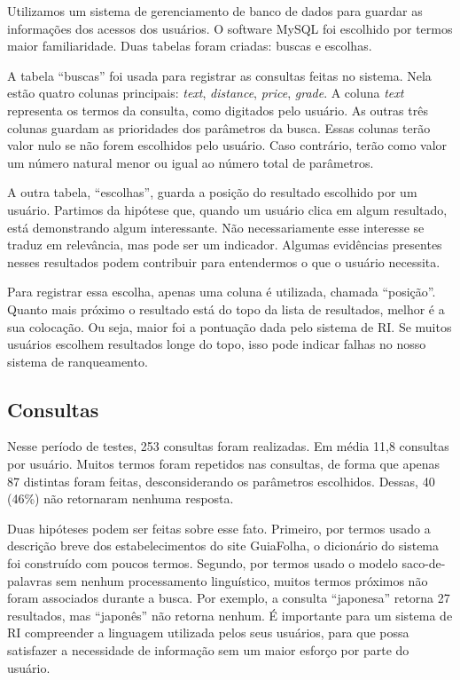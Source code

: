 Utilizamos um sistema de gerenciamento de banco de dados para guardar as informações dos acessos dos usuários. O software MySQL foi escolhido por termos maior familiaridade. Duas tabelas foram criadas: buscas e escolhas.

A tabela ``buscas'' foi usada para registrar as consultas feitas no sistema. Nela estão quatro colunas principais: \emph{text}, \emph{distance}, \emph{price}, \emph{grade}. A coluna \emph{text} representa os termos da consulta, como digitados pelo usuário. As outras três colunas guardam as prioridades dos parâmetros da busca. Essas colunas terão valor nulo se não forem escolhidos pelo usuário. Caso contrário, terão como valor um número natural menor ou igual ao número total de parâmetros.

A outra tabela, ``escolhas'', guarda a posição do resultado escolhido por um usuário. Partimos da hipótese que, quando um usuário clica em algum resultado, está demonstrando algum interessante. Não necessariamente esse interesse se traduz em relevância, mas pode ser um indicador. Algumas evidências presentes nesses resultados podem contribuir para entendermos o que o usuário necessita.

Para registrar essa escolha, apenas uma coluna é utilizada, chamada ``posição''. Quanto mais próximo o resultado está do topo da lista de resultados, melhor é a sua colocação. Ou seja, maior foi a pontuação dada pelo sistema de RI. Se muitos usuários escolhem resultados longe do topo, isso pode indicar falhas no nosso sistema de ranqueamento.

\subsection{Consultas}
\label{subsec:consultas}

Nesse período de testes, 253 consultas foram realizadas. Em média 11,8 consultas por usuário. Muitos termos foram repetidos nas consultas, de forma que apenas 87 distintas foram feitas, desconsiderando os parâmetros escolhidos. Dessas, 40 (46\%) não retornaram nenhuma resposta.

Duas hipóteses podem ser feitas sobre esse fato. Primeiro, por termos usado a descrição breve dos estabelecimentos do site GuiaFolha, o dicionário do sistema foi construído com poucos termos. Segundo, por termos usado o modelo saco-de-palavras sem nenhum processamento linguístico, muitos termos próximos não foram associados durante a busca. Por exemplo, a consulta ``japonesa'' retorna 27 resultados, mas ``japonês'' não retorna nenhum. É importante para um sistema de RI compreender a linguagem utilizada pelos seus usuários, para que possa satisfazer a necessidade de informação sem um maior esforço por parte do usuário.

